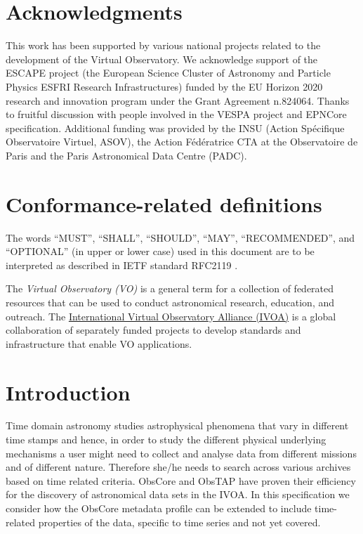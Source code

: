\documentclass[11pt,a4paper]{ivoa}
\begin{document}
\section*{Acknowledgments}
This work has been supported by various national projects related to the development of the Virtual Observatory.
 We acknowledge support of the  ESCAPE project (the European Science Cluster of Astronomy and Particle Physics ESFRI Research Infrastructures) funded by the EU Horizon 2020 research and innovation program under the Grant Agreement n.824064. Thanks to fruitful discussion with people involved in the VESPA project and EPNCore specification.
 Additional funding was provided by the INSU (Action Sp\'ecifique Observatoire Virtuel, ASOV), the Action F\'ed\'eratrice CTA at the Observatoire de Paris and the Paris Astronomical Data Centre (PADC).

\section*{Conformance-related definitions}

The words ``MUST'', ``SHALL'', ``SHOULD'', ``MAY'', ``RECOMMENDED'', and
``OPTIONAL'' (in upper or lower case) used in this document are to be
interpreted as described in IETF standard RFC2119 \citep{std:RFC2119}.

The \emph{Virtual Observatory (VO)} is a
general term for a collection of federated resources that can be used
to conduct astronomical research, education, and outreach.
The \href{https://www.ivoa.net}{International
Virtual Observatory Alliance (IVOA)} is a global
collaboration of separately funded projects to develop standards and
infrastructure that enable VO applications.



\section{Introduction}

Time domain astronomy studies astrophysical phenomena that vary in different time stamps and hence, in order to study the different physical underlying mechanisms a user might need to collect and analyse data from different missions and of different nature. Therefore she/he needs to search across various archives based on time related criteria.
ObsCore and ObsTAP  \citep{2017ivoa.spec.0509L} have proven their efficiency for the discovery of astronomical data sets in the IVOA.
In this specification we consider how the ObsCore metadata profile can be extended to include time-related properties of the data, specific to time series and not yet covered.
\end{document}
